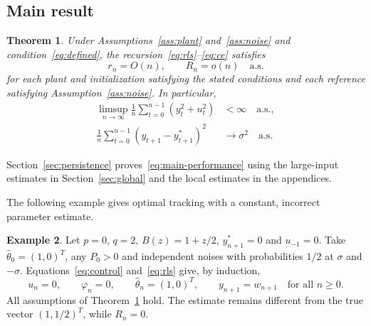 \documentclass[11pt,reqno]{amsart}
\numberwithin{equation}{section}
\newtheorem{theorem}{Theorem}[section]
\theoremstyle{definition}
\newtheorem{example}[theorem]{Example}
\theoremstyle{remark}
\newcommand{\thh}{\widehat\theta}
\newcommand{\ph}{\varphi}
\newcommand{\as}{\quad\text{a.s.}}
\begin{document}
\subsection{Main result}
\begin{theorem}\label{thm:performance}
Under Assumptions~\ref{ass:plant} and~\ref{ass:noise} and condition~\eqref{eq:defined}, the recursion~\eqref{eq:rls}--\eqref{eq:ce} satisfies
\begin{equation}\label{eq:main-performance}
 r_n=O(n),\qquad R_n=o(n)\as
\end{equation}
for each plant and initialization satisfying the stated conditions and each reference satisfying Assumption~\ref{ass:noise}. In particular,
\begin{align}
 \limsup_{n\to\infty}\frac1n\sum_{t=0}^{n-1}(y_t^2+u_t^2)
 &<\infty\as,\label{eq:main-stability}\\
 \frac1n\sum_{t=0}^{n-1}(y_{t+1}-y_{t+1}^*)^2
 &\longrightarrow\sigma^2\as\label{eq:main-tracking}
\end{align}
\end{theorem}

Section~\ref{sec:persistence} proves~\eqref{eq:main-performance} using the large-input estimates in Section~\ref{sec:global} and the local estimates in the appendices.

The following example gives optimal tracking with a constant, incorrect parameter estimate.
\begin{example}\label{ex:inconsistent}
Let $p=0$, $q=2$, $B(z)=1+z/2$, $y_{n+1}^*=0$ and $u_{-1}=0$. Take $\thh_0=(1,0)^T$, any $P_0>0$ and independent noises with probabilities $1/2$ at $\sigma$ and $-\sigma$. Equations~\eqref{eq:control} and~\eqref{eq:rls} give, by induction,
\[
 u_n=0,\qquad \ph_n=0,\qquad
 \thh_n=(1,0)^T,\qquad y_{n+1}=w_{n+1}
 \quad\text{for all }n\ge0.
\]
All assumptions of Theorem~\ref{thm:performance} hold. The estimate remains different from the true vector $(1,1/2)^T$, while $R_n=0$.
\end{example}
\end{document}
